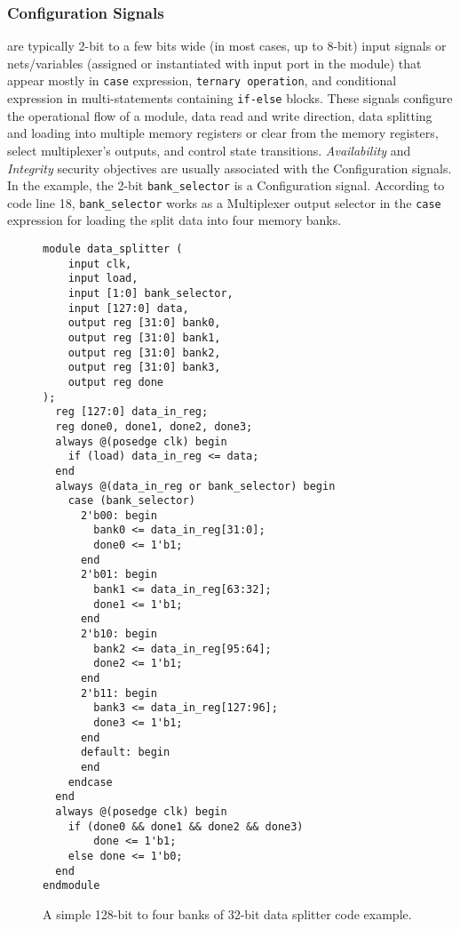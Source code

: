 \subsubsection{Configuration Signals} are typically 2-bit to a few bits wide (in most cases, up to 8-bit) input signals or nets/variables (assigned or instantiated with input port in the module) that appear mostly in \texttt{case} expression, \texttt{ternary operation}, and conditional expression in multi-statements containing \texttt{if-else} blocks. 
These signals configure the operational flow of a module, data read and write direction, data splitting and loading into multiple memory registers or clear from the memory registers, select multiplexer's outputs, and control state transitions. 
\textit{Availability} and \textit{Integrity} security objectives are usually associated with the Configuration signals.
In the example, the 2-bit \texttt{bank\_selector} is a Configuration signal. According to code line 18, \texttt{bank\_selector} works as a Multiplexer output selector in the \texttt{case} expression for loading the split data into four memory banks.


\begin{figure}
\centering
\begin{minipage}{0.9\columnwidth}
\begin{verbatim}
module data_splitter (
    input clk,
    input load,
    input [1:0] bank_selector,
    input [127:0] data,
    output reg [31:0] bank0,
    output reg [31:0] bank1,
    output reg [31:0] bank2,
    output reg [31:0] bank3,
    output reg done
);
  reg [127:0] data_in_reg;
  reg done0, done1, done2, done3;
  always @(posedge clk) begin
    if (load) data_in_reg <= data;
  end
  always @(data_in_reg or bank_selector) begin
    case (bank_selector)
      2'b00: begin
        bank0 <= data_in_reg[31:0];
        done0 <= 1'b1;
      end
      2'b01: begin
        bank1 <= data_in_reg[63:32];
        done1 <= 1'b1;
      end
      2'b10: begin
        bank2 <= data_in_reg[95:64];
        done2 <= 1'b1;
      end
      2'b11: begin
        bank3 <= data_in_reg[127:96];
        done3 <= 1'b1;
      end
      default: begin
      end
    endcase
  end
  always @(posedge clk) begin
    if (done0 && done1 && done2 && done3) 
        done <= 1'b1;
    else done <= 1'b0;
  end
endmodule
\end{verbatim}
\end{minipage}

\caption{A simple 128-bit to four banks of 32-bit data splitter code example.}
\label{fig:code-example}

\end{figure}

